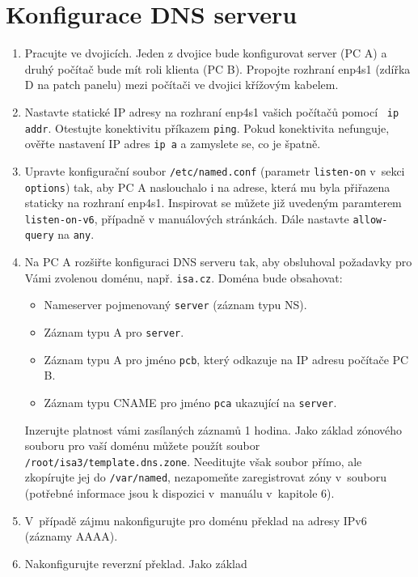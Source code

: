 \section{Konfigurace DNS serveru}
\begin{enumerate}

  \item Pracujte ve dvojicích. Jeden z dvojice bude konfigurovat server (PC A)
    a druhý počítač bude mít roli klienta (PC B). Propojte rozhraní enp4s1 (zdířka
    D na patch panelu) mezi počítači ve dvojici křížovým kabelem.
  \item Nastavte statické IP adresy na rozhraní enp4s1 vašich počítačů pomocí {\tt 
    ip addr}. Otestujte konektivitu příkazem {\tt ping}. Pokud konektivita nefunguje,
    ověřte nastavení IP adres {\tt ip a} a zamyslete se, co je špatně.
  \item Upravte konfigurační soubor {\tt /etc/named.conf} (parametr
    {\tt listen-on} v~sekci {\tt options}) tak, aby
    PC A naslouchalo i na adrese, která mu byla přiřazena staticky na rozhraní enp4s1.
    Inspirovat se můžete již uvedeným paramterem {\tt listen-on-v6}, případně v
    manuálových stránkách. Dále nastavte {\tt allow-query} na {\tt any}.
  \item Na PC A rozšiřte konfiguraci DNS serveru tak, aby obsluhoval požadavky pro Vámi
    zvolenou doménu, např. {\tt isa.cz}. Doména bude obsahovat:
    \begin{itemize}
      \item Nameserver pojmenovaný {\tt server} (záznam typu NS).
      \item Záznam typu A pro {\tt server}.
      \item Záznam typu A pro jméno {\tt pcb}, který odkazuje na IP adresu
        počítače PC B.
      \item Záznam typu CNAME pro jméno {\tt pca} ukazující na {\tt server}.
    \end{itemize}
    Inzerujte platnost vámi zasílaných záznamů 1 hodina.
    Jako základ zónového souboru pro vaší doménu můžete použít soubor 
    {\tt /root/isa3/template.dns.zone}.
    Needitujte však soubor přímo, ale zkopírujte jej do {\tt /var/named}, 
    nezapomeňte zaregistrovat zóny v~souboru  
    (potřebné informace jsou k dispozici v~manuálu v~kapitole 6). 
  \item V~případě zájmu nakonfigurujte pro doménu překlad na adresy IPv6
    (záznamy AAAA).
  \item Nakonfigurujte reverzní překlad. Jako základ

\end{enumerate}
